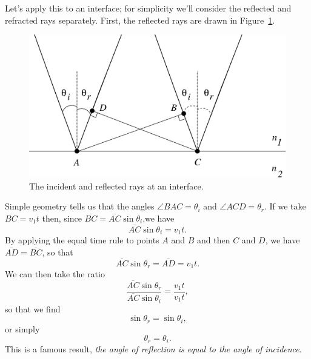 Let's apply this to an interface; for simplicity we'll consider the reflected
and refracted rays separately.  First, the reflected rays are drawn in 
Figure~\ref{fig:opt:reflected}.
\begin{figure}[htb]
\centering 
\epsfxsize=10cm \includegraphics[scale=0.6]{8_refraction/reflected.eps}
\caption{The incident and reflected rays at an interface.}
\label{fig:opt:reflected}
\end{figure}
Simple geometry tells us that the angles $\angle BAC =\theta_i$ and 
$\angle ACD =\theta_r$. If we take $\overline{BC}=v_1 t$ then, since 
$\overline{BC}=\overline{AC}\sin\theta_i$,we have
$$ \overline{AC}\sin\theta_i = v_1 t. $$ 
By applying the equal time rule to points $A$ and $B$ and then $C$ and $D$, we
have $\overline{AD}=\overline{BC}$, so that 
$$ \overline{AC}\sin\theta_r = \overline{AD} = v_1 t. $$ 
We can then take the ratio
$$ \frac{\overline{AC}\sin\theta_r}{\overline{AC}\sin\theta_i} 
=\frac{v_1 t}{v_1 t}, $$
so that we find
$$ \sin\theta_r=\sin\theta_i, $$
or simply
$$ \theta_r=\theta_i. $$
This is a famous result, {\it the angle of reflection is equal to the angle of
incidence}.

